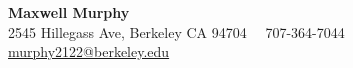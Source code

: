\centering
    {\Large \textbf{Maxwell Murphy}} \\
    {2545 Hillegass Ave, Berkeley CA 94704 \, \textbullet \, 707-364-7044 \, \textbullet \, \href{mailto:murphy2122@berkeley.edu}{murphy2122@berkeley.edu}}

\justifying
